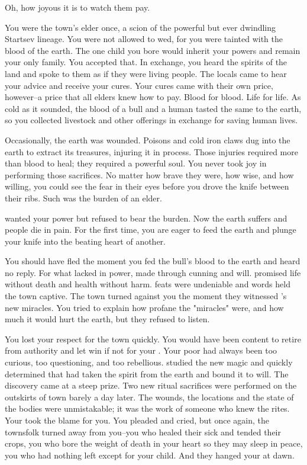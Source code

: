 \documentclass[char]{Pestilence}
\begin{document}
\name{\cShaman{}}

Oh, how joyous it is to watch them pay.

You were the town's elder once, a scion of the powerful but ever dwindling Startsev lineage. You were not allowed to wed, for you were tainted with the blood of the earth. The one child you bore would inherit your powers and remain your only family. You accepted that. In exchange, you heard the spirits of the land and spoke to them as if they were living people. The locals came to hear your advice and receive your cures. Your cures came with their own price, however--a price that all elders knew how to pay. Blood for blood. Life for life. As cold as it sounded, the blood of a bull and a human tasted the same to the earth, so you collected livestock and other offerings in exchange for saving human lives. 

Occasionally, the earth was wounded. Poisons and cold iron claws dug into the earth to extract its treasures, injuring it in process. Those injuries required more than blood to heal; they required a powerful soul. You never took joy in performing those sacrifices. No matter how brave they were, how wise, and how willing, you could see the fear in their eyes before you drove the knife between their ribs. Such was the burden of an elder. 

\cElder{\intro} wanted your power but refused to bear the burden. Now the earth suffers and \cElder{\their} people die in pain. For the first time, you are eager to feed the earth and plunge your knife into the beating heart of another.

You should have fled the moment you fed the bull's blood to the earth and heard no reply. For what \cElder{\they} lacked in power, \cElder{} made through cunning and will. \cElder{} promised life without death and health without harm. \cElder{\Their} feats were undeniable and \cElder{\their} words held the town captive. The town turned against you the moment they witnessed \cElder{}'s new miracles. You tried to explain how profane the "miracles" were, and how much it would hurt the earth, but they refused to listen. 

You lost your respect for the town quickly. You would have been content to retire from authority and let \cElder{} win if not for your \cPlaguebearer{\offspring}. Your poor \cPlaguebearer{} had always been too curious, too questioning, and too rebellious. \cPlaguebearer{\They} studied the new magic and quickly determined that \cElder{} had taken the spirit from the earth and bound it to \cElder{\their} will. The discovery came at a steep prize. Two new ritual sacrifices were performed on the outskirts of town barely a day later. The wounds, the locations and the state of the bodies were unmistakable; it was the work of someone who knew the rites. Your \cPlaguebearer{\offspring} took the blame for you. You pleaded and cried, but once again, the townsfolk turned away from you--you who healed their sick and tended their crops, you who bore the weight of death in your heart so they may sleep in peace, you who had nothing left except for your child. And they hanged your \cPlaguebearer{} at dawn.
\end{document}
